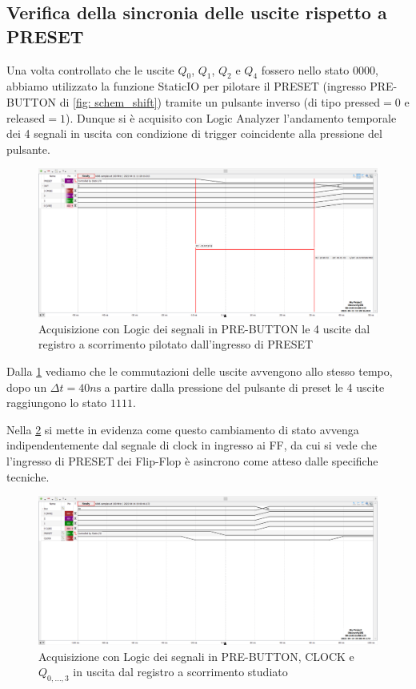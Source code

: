 \documentclass[10pt, a4paper, italian]{article}
\begin{document}
\subsection{Verifica della sincronia delle uscite rispetto a PRESET}
Una volta controllato che le uscite $Q_0$, $Q_1$, $Q_2$ e $Q_4$ fossero nello
stato $0000$, abbiamo utilizzato la funzione StaticIO per pilotare il PRESET
(ingresso PRE-BUTTON di \cref{fig: schem_shift}) tramite un pulsante inverso
(di tipo pressed$ = 0$ e released$ = 1$).
Dunque si è acquisito con Logic Analyzer l'andamento temporale dei 4 segnali
in uscita con condizione di trigger coincidente alla pressione del pulsante.
\begin{figure}[htbp]
\centering
	\includegraphics[width=\textwidth]{3.trans}
	\caption{Acquisizione con Logic dei segnali in PRE-BUTTON le 4 uscite dal
	registro a scorrimento pilotato dall'ingresso di PRESET
	\label{fig: Shift_reg_trans}}
\end{figure}

Dalla \cref{fig: Shift_reg_trans} vediamo che le commutazioni delle
uscite avvengono allo stesso tempo, dopo un $\Delta t = 40 \si{n\s}$ a partire
dalla pressione del pulsante di preset le 4 uscite raggiungono lo stato $1111$.

Nella \cref{fig: reg_presync} si mette in evidenza come questo cambiamento di
stato avvenga indipendentemente dal segnale di clock in ingresso ai FF, da cui
si vede che l'ingresso di PRESET dei Flip-Flop è asincrono come atteso dalle
specifiche tecniche.
\begin{figure}[htbp]
\centering
	\includegraphics[width=\textwidth]{3.b}
	\caption{Acquisizione con Logic dei segnali in PRE-BUTTON, CLOCK e
	$Q_{0, \ldots, 3}$ in uscita dal registro a scorrimento studiato
	\label{fig: reg_presync}}
\end{figure}
\end{document}
